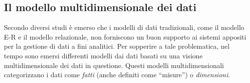 \subsection{Il modello multidimensionale dei dati}

Secondo diversi studi è emerso che i modelli di dati tradizionali, come il modello E-R e il modello relazionale, non forniscono un buon supporto ai sistemi appositi per la gestione di dati a fini analitici. Per sopperire a tale problematica, nel tempo sono emersi differenti modelli dai dati basati su una visione multidimensionale dei dati in questione. Questi modelli multidimensionali categorizzano i dati come \textit{fatti} (anche definiti come “misure”) o \textit{dimensioni}.\cite{ieee_multidimensional_data_modeling}

